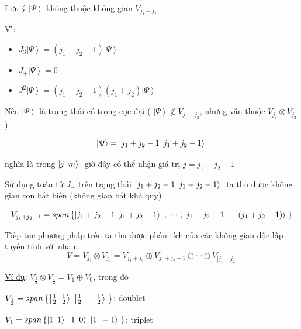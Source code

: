 \documentclass{report}
\begin{document}
Lưu ý \( \left| \Psi \right\rangle \) không thuộc không gian \( V_{j_{1}+j_{2}} \)

Vì:

	\begin{itemize}
		\item \( J_{3} \left| \Psi \right\rangle = ( j_{1} + j_{2} -1 ) \left| \Psi \right\rangle \)
		\item \( J_{+} \left| \Psi \right\rangle = 0 \)
		\item \( J^{2} \left| \Psi \right\rangle = ( j_{1} + j_{2} -1 ) ( j_{1} + j_{2} ) \left| \Psi \right\rangle \)
	\end{itemize}

Nên \( \left| \Psi \right\rangle \) là trạng thái có trọng cực đại ( \( \left| \Psi \right\rangle \notin V_{j_{1}+j_{2}} \), nhưng vẫn thuộc \( V_{j_{1}} \otimes V_{j_{2}} \)) 

\[ \left| \Psi \right\rangle = \left| j_{1} + j_{2} - 1 \enskip j_{1} + j_{2} - 1 \right\rangle\ \]

nghĩa là trong \( \left| j \enskip m \right\rangle\ \) giờ đây có thể nhận giá trị \( j = j_{1} + j_{2} -1 \)

Sử dụng toán tử \(J_{-}\) trên trạng thái \( \left| j_{1} + j_{2} - 1 \enskip j_{1} + j_{2} - 1 \right\rangle\ \) ta thu được không gian con bất biến (không gian bất khả quy)

\[ V_{j_{1}+j_{2} - 1} = span \left\lbrace \left| j_{1} + j_{2} - 1 \enskip j_{1} + j_{2} - 1 \right\rangle\ , \cdots , \left| j_{1} + j_{2} - 1 \enskip - \left( j_{1} + j_{2} - 1 \right) \right\rangle\ \right\rbrace \]

Tiếp tục phương pháp trên ta thu được phân tích của các không gian độc lập tuyến tính với nhau: 
 \[ V = V_{j_{1}} \otimes V_{j_{2}} = V_{j_{1}+j_{2}} \oplus  V_{j_{1}+j_{2}-1} \oplus \cdots \oplus V_{\left| j_{1}-j_{2} \right|} \]

\underline{Ví dụ}: \(V_{\frac{1}{2}} \otimes V_{\frac{1}{2}} = V_{1} \oplus V_{0}\), trong đó

\hspace*{0.5cm} \( V_{\frac{1}{2}} = span\left\lbrace  \left| \frac{1}{2} \enskip \frac{1}{2} \right\rangle\ \left| \frac{1}{2} \enskip -\frac{1}{2} \right\rangle\ \right\rbrace \): doublet

\hspace*{0.5cm} \( V_{1} = span\left\lbrace  \left| 1 \enskip 1 \right\rangle\ \left| 1 \enskip 0 \right\rangle\ \left| 1 \enskip -1 \right\rangle\ \right\rbrace \): triplet
\end{document}

